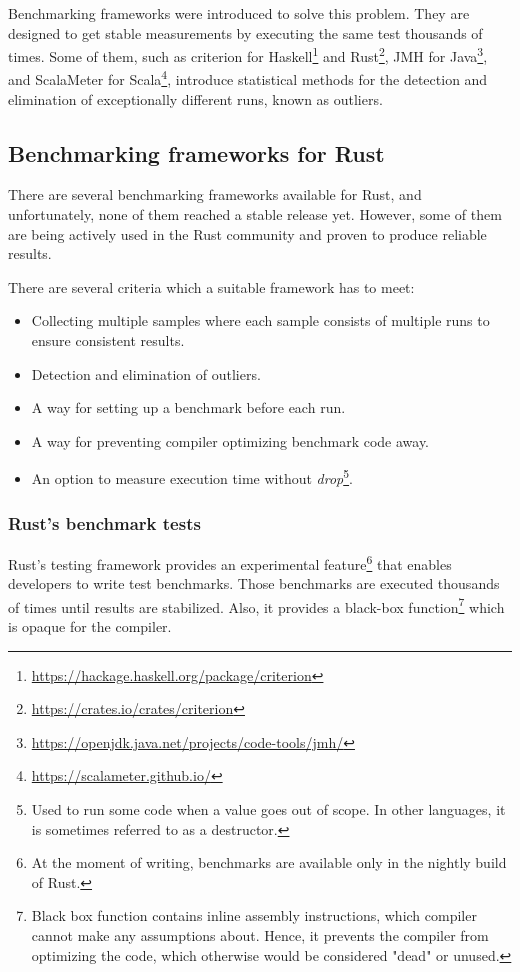 Benchmarking frameworks were introduced to solve this problem. They are designed to get stable measurements by executing the same test thousands of times. Some of them, such as criterion for Haskell\footnote{\url{https://hackage.haskell.org/package/criterion}} and Rust\footnote{\url{https://crates.io/crates/criterion}}, JMH for Java\footnote{\url{https://openjdk.java.net/projects/code-tools/jmh/}}, and ScalaMeter for Scala\footnote{\url{https://scalameter.github.io/}}, introduce statistical methods for the detection and elimination of exceptionally different runs, known as outliers.

\subsection{Benchmarking frameworks for Rust}
There are several benchmarking frameworks available for Rust, and unfortunately, none of them reached a stable release yet. However, some of them are being actively used in the Rust community and proven to produce reliable results.

There are several criteria which a suitable framework has to meet:
\begin{itemize}
    \item Collecting multiple samples where each sample consists of multiple runs to ensure consistent results.
    \item Detection and elimination of outliers.
    \item A way for setting up a benchmark before each run.
    \item A way for preventing compiler optimizing benchmark code away.
    \item An option to measure execution time without \emph{drop}\footnote{Used to run some code when a value goes out of scope. In other languages, it is sometimes referred to as a destructor.}.
\end{itemize}

\subsubsection*{Rust's benchmark tests}
Rust's testing framework provides an experimental feature\footnote{At the moment of writing, benchmarks are available only in the nightly build of Rust.} that enables developers to write test benchmarks. Those benchmarks are executed thousands of times until results are stabilized. Also, it provides a black-box function\footnote{Black box function contains inline assembly instructions, which compiler cannot make any assumptions about. Hence, it prevents the compiler from optimizing the code, which otherwise would be considered "dead" or unused.} which is opaque for the compiler.

